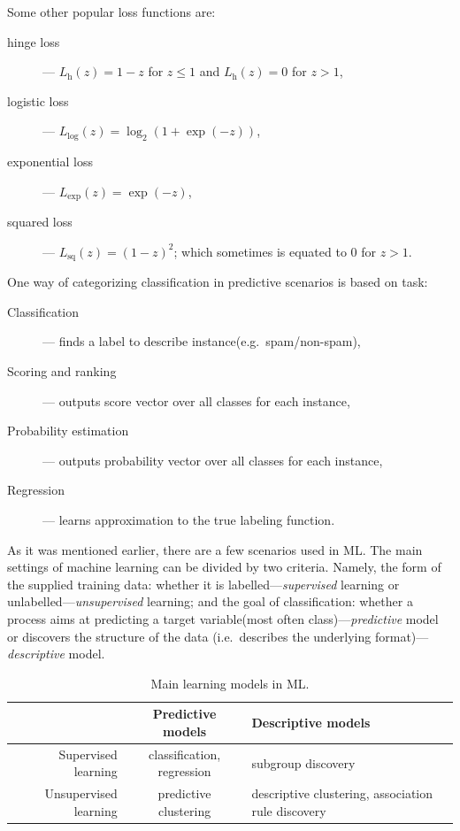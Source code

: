 \documentclass[12pt, a4paper, pdflatex, leqno, twoside]{report}
\begin{document}
Some other popular loss functions are:
\begin{description}
\item[hinge loss] --- $L_{\text{h}} (z) = 1 - z$ for $z \leq 1$ and $L_{\text{h}} 
(z) = 0$ for $z > 1$,
\item[logistic loss] --- $L_{\text{log}} (z) = \log_2 (1 + \exp(-z))$,
\item[exponential loss] --- $L_{\text{exp}} (z) = \exp(-z)$,
\item[squared loss] --- $L_{\text{sq}} (z) = (1 - z)^2$; which sometimes is equated 
to $0$ for $z>1$.\\
\end{description}
                      
One way of categorizing classification in predictive scenarios is based on task:
\begin{description}
\item[Classification] --- finds a label to describe instance(e.g.\ spam/non-spam),
\item[Scoring and ranking] ---  outputs score vector over all 
classes for each instance,
\item[Probability estimation] --- outputs probability vector over 
all classes for each instance,
\item[Regression] --- learns approximation to the true labeling function.\\
\end{description}

As it was mentioned earlier, there are a few scenarios used in ML. The main settings of 
machine learning can be divided by two criteria. Namely, the form of the supplied 
training data: whether it is labelled---\emph{supervised} learning or 
unlabelled---\emph{unsupervised} learning; and the goal of classification: whether a 
process aims at predicting a target variable(most often class)---\emph{predictive} model or discovers the structure of the data (i.e.\ describes the 
underlying format)---\emph{descriptive} model.\\

\begin{table}[htbp]
  \begin{tabular}{ r | c p{5cm} }
                         & Predictive models          & Descriptive models \\
    \hline
    Supervised learning   & classification, regression & subgroup discovery \\
    Unsupervised learning & predictive clustering      & descriptive 
clustering, association rule discovery \\
  \end{tabular}~\\[0.1cm]
  \caption{Main learning models in ML.\label{fig:learning_models}}
\end{table}~\\
\end{document}
